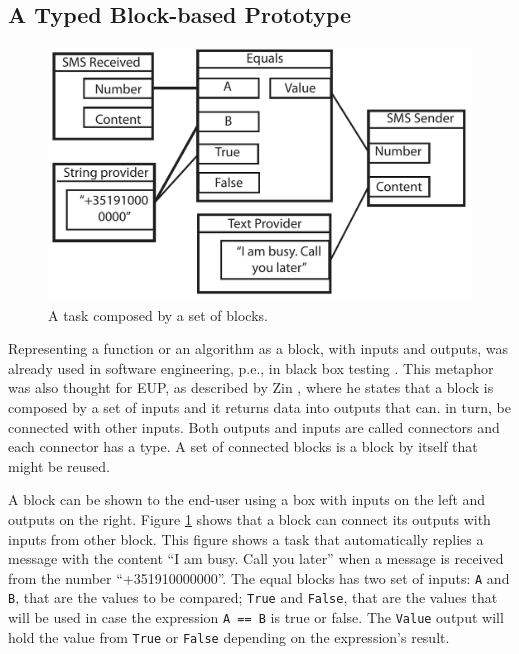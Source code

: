 \documentclass[9pt,a4paper]{extarticle}
\begin{document}
\begin{multicols}{2}
\subsection{A Typed Block-based Prototype}


\begin{figure}[H]
\centerline{\includegraphics[scale=.43]{block_example.pdf}}
\label{fig:block}
\caption{A task composed by a set of blocks.} 
\end{figure}

Representing a function or an algorithm as a block, with inputs and outputs, was already used in software engineering, p.e., in black box testing \cite{BlackBoxTesting}. This metaphor was also thought for EUP, as described by Zin \cite{Zin2011}, where he states that a block is composed by a set of inputs and it returns data into outputs that can. in turn, be connected with other inputs.
Both outputs and inputs are called connectors and each connector has a type. A set of connected blocks is a block by itself that might be reused. 

A block can be shown to the end-user using a box with inputs on the left and outputs on the right.
Figure \ref{fig:block} shows that a block can connect its outputs with inputs from other block. This figure shows a task that automatically replies a message with the content ``I am busy. Call you later'' when a message is received from the number ``+351910000000''. The equal blocks has two set of inputs: \texttt{A} and  \texttt{B}, that are the values to be compared; \texttt{True} and  \texttt{False}, that are the values that will be used in case the expression \texttt{A == B} is true or false. The \texttt{Value} output will hold the value from \texttt{True} or \texttt{False} depending on the expression's result. 


\end{multicols}
\end{document}
